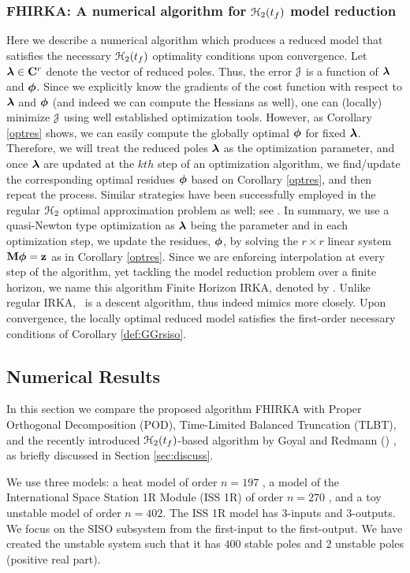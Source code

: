 \documentclass[twocolumn]{autart}
\begin{document}
\subsubsection{FHIRKA: A numerical algorithm for $\EuScript{H}_2(t_f)$ model reduction}
Here we describe a numerical algorithm which produces a reduced model that satisfies the necessary $\EuScript{H}_2({t_f})$ optimality conditions upon convergence. Let ${\boldsymbol{\lambda}} \in \mathbf{C}^r$ denote the vector of reduced poles. Thus,
the error $\EuScript{J}$ is a function of ${\boldsymbol{\lambda}}$ and ${\boldsymbol{\phi}}$. Since we explicitly know the gradients of the cost function
with respect to ${\boldsymbol{\lambda}}$ and ${\boldsymbol{\phi}}$ (and indeed we can compute the Hessians as well), one can (locally) minimize $\EuScript{J}$ using well established optimization tools. However, as   Corollary \ref{optres} shows,  we can easily compute the globally optimal ${\boldsymbol{\phi}}$ for fixed  ${\boldsymbol{\lambda}}$. Therefore, 
we will treat the reduced  poles ${\boldsymbol{\lambda}}$ as the optimization parameter, and once ${\boldsymbol{\lambda}}$ are updated at the $kth$ step of an optimization algorithm, we find/update the  corresponding optimal residues ${\boldsymbol{\phi}}$ based on Corollary \ref{optres}, and then repeat the process. Similar strategies have been successfully employed in the regular 
$\EuScript{H}_2$ optimal approximation problem as well; see \cite{beattie2012realization,beattie2009trust}. In summary,
we use a quasi-Newton type optimization as ${\boldsymbol{\lambda}}$ being the parameter and in each optimization  step,
we update the residues,  ${\boldsymbol{\phi}}$, by solving the $r\times r$ linear system $\mathbf{M} {\boldsymbol{\phi}} = \mathbf{z}$  as in Corollary \ref{optres}.  Since we are enforcing interpolation at every step of the algorithm, yet tackling the model reduction problem over a finite horizon, we name this algorithm Finite Horizon IRKA, denoted by \FH.  Unlike regular IRKA,  \FH \ is a descent algorithm, thus indeed mimics \cite{beattie2009trust} more closely. Upon convergence, the locally optimal reduced model satisfies the first-order necessary conditions of 
Corollary \ref{def:GGrsiso}.

\subsection{Numerical Results}  
In this section we compare the proposed algorithm FHIRKA with  Proper Orthogonal Decomposition (POD), Time-Limited Balanced Truncation (TLBT), and the recently introduced $\EuScript{H}_2(t_f)$-based algorithm  by Goyal and Redmann (\goyal) \cite{GoyR17}, as briefly discussed in Section \ref{sec:discuss}.  

We use three models: a heat model of order $n=197$ \cite{Niconet}, a model of  the International Space Station 1R Module (ISS 1R) of order $n=270$ \cite{gugercin2001approximation}, and a toy unstable model of order $n=402$. 
The ISS 1R model has $3$-inputs and $3$-outputs. We  focus on the SISO subsystem from the first-input to the first-output.
We have created the unstable system such that it has $400$ stable poles and $2$ unstable poles (positive real part).
\end{document}
